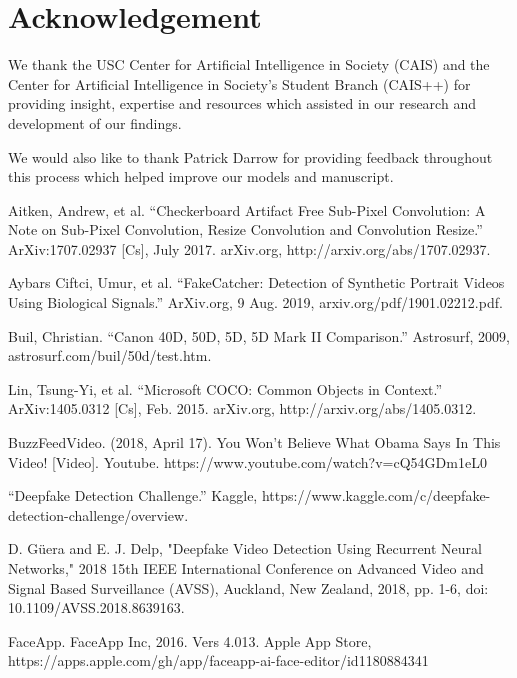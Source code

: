 \documentclass[a4paper]{article}
\begin{document}
\section*{Acknowledgement}

We thank the USC Center for Artificial Intelligence in Society (CAIS) and the Center for Artificial Intelligence in Society's Student Branch (CAIS++) for providing insight, expertise and resources which assisted in our research and development of our findings.

\par
We would also like to thank Patrick Darrow for providing feedback throughout this process which helped improve our models and manuscript.

\newpage

\begin{thebibliography}{9}

    Aitken, Andrew, et al. “Checkerboard Artifact Free Sub-Pixel Convolution: A Note on Sub-Pixel Convolution, Resize Convolution and Convolution Resize.” ArXiv:1707.02937 [Cs], July 2017. arXiv.org, http://arxiv.org/abs/1707.02937.

    Aybars Ciftci, Umur, et al. “FakeCatcher: Detection of Synthetic Portrait Videos Using Biological Signals.” ArXiv.org, 9 Aug. 2019, arxiv.org/pdf/1901.02212.pdf.

    Buil, Christian. “Canon 40D, 50D, 5D, 5D Mark II Comparison.” Astrosurf, 2009, astrosurf.com/buil/50d/test.htm.
    
    Lin, Tsung-Yi, et al. “Microsoft COCO: Common Objects in Context.” ArXiv:1405.0312 [Cs], Feb. 2015. arXiv.org, http://arxiv.org/abs/1405.0312.

    BuzzFeedVideo. (2018, April 17). You Won’t Believe What Obama Says In This Video! [Video]. Youtube. https://www.youtube.com/watch?v=cQ54GDm1eL0 

    “Deepfake Detection Challenge.” Kaggle, https://www.kaggle.com/c/deepfake-detection-challenge/overview.

    D. Güera and E. J. Delp, "Deepfake Video Detection Using Recurrent Neural Networks," 2018 15th IEEE International Conference on Advanced Video and Signal Based Surveillance (AVSS), Auckland, New Zealand, 2018, pp. 1-6, doi: 10.1109/AVSS.2018.8639163.

    FaceApp. FaceApp Inc, 2016. Vers 4.013. Apple App Store, https://apps.apple.com/gh/app/faceapp-ai-face-editor/id1180884341


\end{thebibliography}
\end{document}
